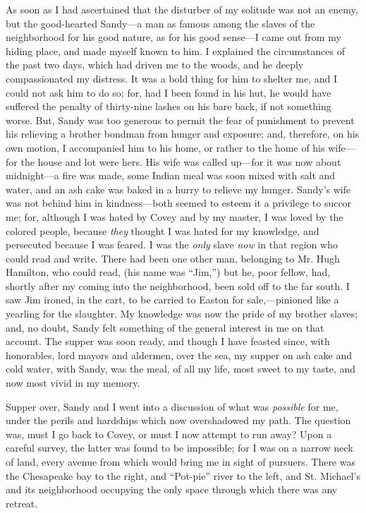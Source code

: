 As soon as I had ascertained that the disturber of my solitude was not
an enemy, but the good-hearted Sandy---a man as famous among the slaves
of the neighborhood for his good nature, as for his good sense---I came
out from my hiding place, and made myself known to him. I explained the
circumstances of the past two days, which had driven me to the woods,
and he deeply compassionated my distress. It was a bold thing for him to
shelter me, and I could not ask him to do so; for, had I been found in
his hut, he would have suffered the penalty of thirty-nine lashes on his
bare back, if not something worse. But, {}Sandy was too generous to
permit the fear of punishment to prevent his relieving a brother bondman
from hunger and exposure; and, therefore, on his own motion, I
accompanied him to his home, or rather to the home of his wife---for the
house and lot were hers. His wife was called up---for it was now about
midnight---a fire was made, some Indian meal was soon mixed with salt
and water, and an ash cake was baked in a hurry to relieve my hunger.
Sandy's wife was not behind him in kindness---both seemed to esteem it a
privilege to succor me; for, although I was hated by Covey and by my
master, I was loved by the colored people, because \emph{they} thought I
was hated for my knowledge, and persecuted because I was feared. I was
the \emph{only} slave \emph{now} in that region who could read and
write. There had been one other man, belonging to Mr. Hugh Hamilton, who
could read, (his name was ``Jim,'') but he, poor fellow, had, shortly
after my coming into the neighborhood, been sold off to the far south. I
saw Jim ironed, in the cart, to be carried to Easton for
sale,---pinioned like a yearling for the slaughter. My knowledge was now
the pride of my brother slaves; and, no doubt, Sandy felt something of
the general interest in me on that account. The supper was soon ready,
and though I have feasted since, with honorables, lord mayors and
aldermen, over the sea, my supper on ash cake and cold water, with
Sandy, was the meal, of all my life, most sweet to my taste, and now
most vivid in my memory.

Supper over, Sandy and I went into a discussion of what was
\emph{possible} for me, under the perils and {}hardships which now
overshadowed my path. The question was, must I go back to Covey, or must
I now attempt to run away? Upon a careful survey, the latter was found
to be impossible; for I was on a narrow neck of land, every avenue from
which would bring me in sight of pursuers. There was the Chesapeake bay
to the right, and ``Pot-pie'' river to the left, and St. Michael's and
its neighborhood occupying the only space through which there was any
retreat.

